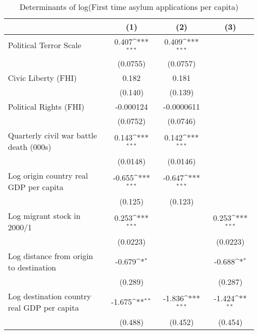 \begin{table}[htbp]\centering
\def\sym#1{\ifmmode^{#1}\else\(^{#1}\)\fi}
\caption{Determinants of log(First time asylum applications per capita)}
\begin{tabular}{l*{3}{c}}
\hline\hline
                    &\multicolumn{1}{c}{(1)}         &\multicolumn{1}{c}{(2)}         &\multicolumn{1}{c}{(3)}         \\
\hline
Political Terror Scale&       0.407\sym{***}&       0.409\sym{***}&                     \\
                    &    (0.0755)         &    (0.0757)         &                     \\
[1em]
Civic Liberty (FHI) &       0.182         &       0.181         &                     \\
                    &     (0.140)         &     (0.139)         &                     \\
[1em]
Political Rights (FHI)&   -0.000124         &  -0.0000611         &                     \\
                    &    (0.0752)         &    (0.0746)         &                     \\
[1em]
Quarterly civil war battle death (000s)&       0.143\sym{***}&       0.142\sym{***}&                     \\
                    &    (0.0148)         &    (0.0146)         &                     \\
[1em]
Log origin country real GDP per capita&      -0.655\sym{***}&      -0.647\sym{***}&                     \\
                    &     (0.125)         &     (0.123)         &                     \\
[1em]
Log migrant stock in 2000/1&       0.253\sym{***}&                     &       0.253\sym{***}\\
                    &    (0.0223)         &                     &    (0.0223)         \\
[1em]
Log distance from origin to destination&      -0.679\sym{*}  &                     &      -0.688\sym{*}  \\
                    &     (0.289)         &                     &     (0.287)         \\
[1em]
Log destination country real GDP per capita&      -1.675\sym{**} &      -1.836\sym{***}&      -1.424\sym{**} \\
                    &     (0.488)         &     (0.452)         &     (0.454)         \\

\end{tabular}
\end{table}
